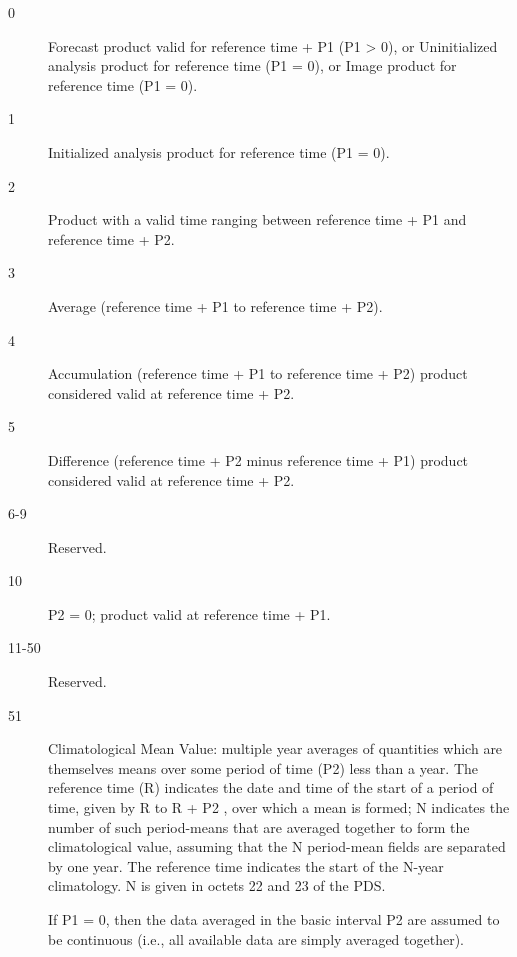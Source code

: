 \documentclass[final,12pt,a4paper,twoside]{book}
\begin{document}
\begin{description}
\item [0]
  Forecast product valid for reference time + P1 (P1 > 0), or Uninitialized
  analysis product for reference time (P1 = 0), or Image product for reference
  time (P1 = 0).
\item [1]
  Initialized analysis product for reference time (P1 = 0).
\item [2]
  Product with a valid time ranging between reference time + P1 and reference time + P2.
\item [3]
  Average (reference time + P1  to reference time + P2).
\item [4]
  Accumulation (reference time + P1 to reference time + P2) product
  considered valid at reference time + P2.
\item [5]
  Difference (reference time + P2 minus reference time + P1) product
  considered valid at reference time + P2.
\item [6-9] Reserved.
\item [10]
  P2 = 0; product valid at reference time + P1.
\item [11-50] Reserved.
\item [51]
  Climatological Mean Value: multiple year averages of quantities which are
  themselves means over some period of time (P2) less than a year. The
  reference time (R) indicates the date and time of the start of a period of
  time, given by R to R + P2 , over which a mean is formed; N indicates the
  number of such period-means that are averaged together to form the
  climatological value, assuming that the N period-mean fields are separated by
  one year. The reference time indicates the start of the N-year climatology. N
  is given in octets 22 and 23 of the PDS.

  If P1 = 0, then the data averaged in the basic interval P2 are assumed to be
  continuous (i.e., all available data are simply averaged together).


\end{description}
\end{document}
